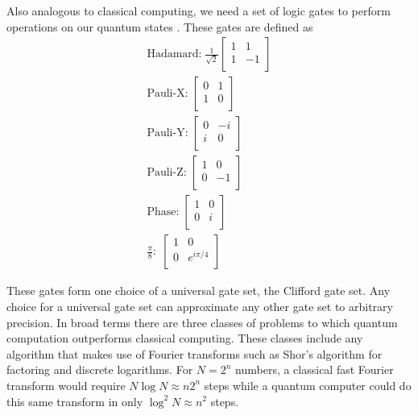 \documentclass[aps,pra,twocolumn,amsmath,amssymb,nofootinbib,superscriptaddress]{revtex4}
\begin{document}
 Also analogous to classical computing, we need a set of logic gates to perform operations on our quantum states \cite{nielsen}. These gates are defined as
\begin{eqnarray}
\textrm{Hadamard:} \;  \frac{1}{\sqrt{2}}\left[ 
\begin{array}{cc}
1&1 \\
1&-1 \\
\end{array} \right] \\
\textrm{Pauli-X:}\; \left[
\begin{array}{cc}
0&1\\
1&0\\
\end{array} \right] \\
\textrm{Pauli-Y:}\; \left[
\begin{array}{cc}
0&-i\\
i&0\\
\end{array} \right] \\
\textrm{Pauli-Z:}\; \left[
\begin{array}{cc}
1&0\\
0&-1\\
\end{array} \right] \\
\textrm{Phase:}\; \left[
\begin{array}{cc}
1&0\\
0&i\\
\end{array} \right] \\
\frac{\pi}{8}:\; \left[
\begin{array}{cc}
1&0\\
0&e^{i \pi/4}\\
\end{array} \right] 
\end{eqnarray}

These gates form one choice of a universal gate set, the Clifford gate set. Any choice for a universal gate set can approximate any other gate set to arbitrary precision.
In broad terms there are three classes of problems to which quantum computation outperforms classical computing. These classes include any algorithm that makes use of Fourier transforms such as Shor's algorithm for factoring and discrete logarithms.  For $ N= 2^n$ numbers, a classical fast Fourier transform would require $ N \log{N} \approx n2^n$ steps while a quantum computer could do this same transform in only $\log^2{N} \approx n^2$ steps.\cite{nielsen} 
\end{document}
